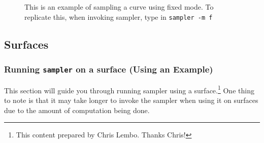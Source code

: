 \begin{figure}[!htb]\centering
     \caption{This is an example of sampling a curve using fixed mode. To replicate this, when invoking sampler, type in {\tt sampler -m f}}
\end{figure}


\subsection{Surfaces}
\label{sec:sampler_surface}

\subsubsection{Running {\tt sampler} on a surface (Using an Example)}

This section will guide you through running sampler using a surface.\footnote{This content prepared by Chris Lembo.  Thanks Chris!}
 One thing to note is that it may take longer to invoke the sampler when using it on surfaces due to the amount of computation being done.

